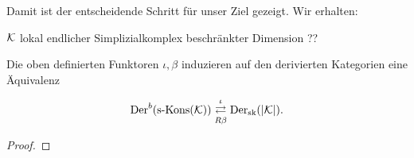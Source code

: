 Damit ist der entscheidende Schritt für unser Ziel gezeigt. Wir
erhalten:

\begin{theorem}
  $\mathcal{K}$ lokal endlicher Simplizialkomplex beschränkter Dimension ??

  Die oben definierten Funktoren $\iota, \beta$ induzieren auf den
  derivierten Kategorien eine Äquivalenz

  \[ \operatorname{Der}^b(\operatorname{s-Kons}(\mathcal{K})) \mathrel{\mathop{\rightleftarrows}^{\iota}_{R \beta}} \operatorname{Der}_{\mathrm{sk}}(|\mathcal{K}|). \]
\end{theorem}
\begin{proof}
  
\end{proof}


